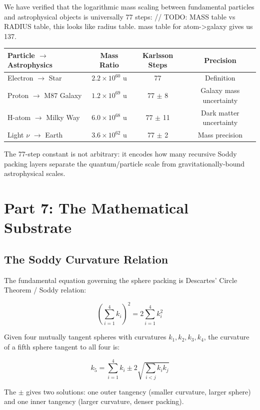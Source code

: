 \documentclass[11pt,a4paper]{article}
\begin{document}
We have verified that the logarithmic mass scaling between fundamental particles and astrophysical objects is universally 77 steps:
// TODO: MASS table vs RADIUS table, this looks like radius table. mass table for atom->galaxy gives us 137.


\begin{center}
\begin{tabular}{lccc}
\hline
\textbf{Particle $\to$ Astrophysics} & \textbf{Mass Ratio} & \textbf{Karlsson Steps} & \textbf{Precision} \\
\hline
Electron $\to$ Star & $2.2 \times 10^{60}$ u & 77 & Definition \\
Proton $\to$ M87 Galaxy & $1.2 \times 10^{69}$ u & 77 $\pm$ 8 & Galaxy mass uncertainty \\
H-atom $\to$ Milky Way & $6.0 \times 10^{68}$ u & 77 $\pm$ 11 & Dark matter uncertainty \\
Light $\nu$ $\to$ Earth & $3.6 \times 10^{62}$ u & 77 $\pm$ 2 & Mass precision \\
\hline
\end{tabular}
\end{center}

The 77-step constant is not arbitrary: it encodes how many recursive Soddy packing layers separate the quantum/particle scale from gravitationally-bound astrophysical scales.

\section{Part 7: The Mathematical Substrate}

\subsection{The Soddy Curvature Relation}

The fundamental equation governing the sphere packing is Descartes' Circle Theorem / Soddy relation:

\[
\boxed{\left(\sum_{i=1}^4 k_i\right)^2 = 2\sum_{i=1}^4 k_i^2}
\]

Given four mutually tangent spheres with curvatures $k_1, k_2, k_3, k_4$, the curvature of a fifth sphere tangent to all four is:

\[
k_5 = \sum_{i=1}^4 k_i \pm 2\sqrt{\sum_{i<j} k_i k_j}
\]

The $\pm$ gives two solutions: one outer tangency (smaller curvature, larger sphere) and one inner tangency (larger curvature, denser packing).
\end{document}
